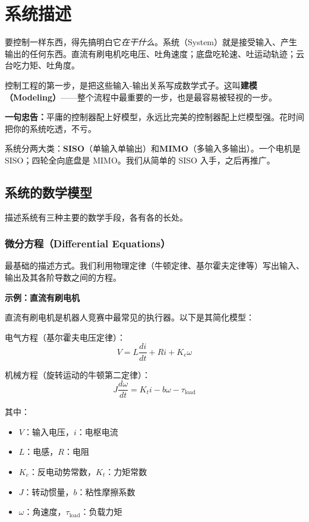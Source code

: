 \section{系统描述}

要控制一样东西，得先搞明白它\textit{在干什么}。系统（System）就是接受输入、产生输出的任何东西。直流有刷电机吃电压、吐角速度；底盘吃轮速、吐运动轨迹；云台吃力矩、吐角度。

控制工程的第一步，是把这些输入-输出关系写成数学式子。这叫\textbf{建模（Modeling）}——整个流程中最重要的一步，也是最容易被轻视的一步。

\textbf{一句忠告：}平庸的控制器配上好模型，永远比完美的控制器配上烂模型强。花时间把你的系统吃透，不亏。

系统分两大类：\textbf{SISO}（单输入单输出）和\textbf{MIMO}（多输入多输出）。一个电机是 SISO；四轮全向底盘是 MIMO。我们从简单的 SISO 入手，之后再推广。

\subsection{系统的数学模型}

描述系统有三种主要的数学手段，各有各的长处。

\subsubsection{微分方程（Differential Equations）}

最基础的描述方式。我们利用物理定律（牛顿定律、基尔霍夫定律等）写出输入、输出及其各阶导数之间的方程。

\textbf{示例：直流有刷电机}

直流有刷电机是机器人竞赛中最常见的执行器。以下是其简化模型：

电气方程（基尔霍夫电压定律）：
\begin{equation}
V = L \frac{di}{dt} + Ri + K_e \omega
\end{equation}

机械方程（旋转运动的牛顿第二定律）：
\begin{equation}
J \frac{d\omega}{dt} = K_t i - b\omega - \tau_{\text{load}}
\end{equation}

其中：
\begin{itemize}[nosep]
    \item $V$：输入电压，$i$：电枢电流
    \item $L$：电感，$R$：电阻
    \item $K_e$：反电动势常数，$K_t$：力矩常数
    \item $J$：转动惯量，$b$：粘性摩擦系数
    \item $\omega$：角速度，$\tau_{\text{load}}$：负载力矩
\end{itemize}

